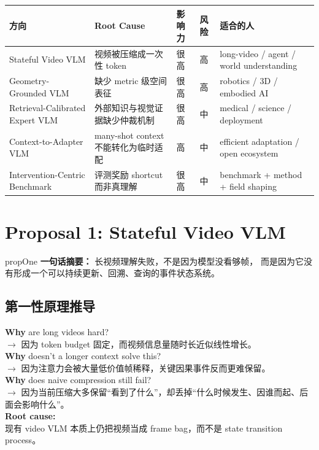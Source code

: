 \documentclass[12pt,a4paper]{article}
\begin{document}
\renewcommand{\arraystretch}{1.25}
\begin{center}
\begin{tabular}{>{\raggedright\arraybackslash}p{3.3cm} >{\raggedright\arraybackslash}p{4.8cm} >{\centering\arraybackslash}p{1.2cm} >{\centering\arraybackslash}p{1.2cm} >{\raggedright\arraybackslash}p{3.3cm}}
\toprule
\textbf{方向} & \textbf{Root Cause} & \textbf{影响力} & \textbf{风险} & \textbf{适合的人} \\
\midrule
Stateful Video VLM & 视频被压缩成一次性 token & 很高 & 高 & long-video / agent / world understanding \\
Geometry-Grounded VLM & 缺少 metric 级空间表征 & 很高 & 高 & robotics / 3D / embodied AI \\
Retrieval-Calibrated Expert VLM & 外部知识与视觉证据缺少仲裁机制 & 很高 & 中 & medical / science / deployment \\
Context-to-Adapter VLM & many-shot context 不能转化为临时适配 & 高 & 中 & efficient adaptation / open ecosystem \\
Intervention-Centric Benchmark & 评测奖励 shortcut 而非真理解 & 很高 & 中 & benchmark + method + field shaping \\
\bottomrule
\end{tabular}
\end{center}

\newpage
\section{Proposal 1: Stateful Video VLM}

\begin{proposalbox}{propOne}
\textbf{一句话摘要：}
长视频理解失败，不是因为模型没看够帧，
而是因为它没有形成一个可以持续更新、回溯、查询的事件状态系统。
\end{proposalbox}

\subsection{第一性原理推导}

\begin{whybox}
\textbf{Why} are long videos hard?\\
$\rightarrow$ 因为 token budget 固定，而视频信息量随时长近似线性增长。\\[3pt]
\textbf{Why} doesn't a longer context solve this?\\
$\rightarrow$ 因为注意力会被大量低价值帧稀释，关键因果事件反而更难保留。\\[3pt]
\textbf{Why} does naive compression still fail?\\
$\rightarrow$ 因为当前压缩大多保留``看到了什么''，却丢掉``什么时候发生、因谁而起、后面会影响什么''。\\[3pt]
\textbf{Root cause:}\\
现有 video VLM 本质上仍把视频当成 frame bag，而不是 state transition process。
\end{whybox}
\end{document}
